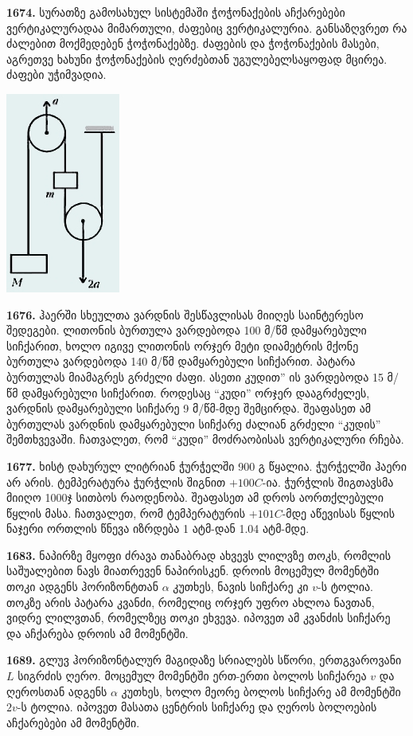 \documentclass[12pt,a4paper,]{report}
\begin{document}
\textbf{1674.} სურათზე გამოსახულ სისტემაში ჭოჭონაქების აჩქარებები ვერტიკალურადაა მიმართული, ძაფებიც ვერტიკალურია. განსაზღვრეთ რა ძალებით მოქმედებენ ჭოჭონაქებზე. ძაფების და ჭოჭონაქების მასები, აგრეთვე ხახუნი ჭოჭონაქების ღერძებთან უგულებელსაყოფად მცირეა. ძაფები უჭიმვადია.
		\begin{center}
			\includegraphics[scale=0.5]{images/F1674}
		\end{center}

\textbf{1676.} ჰაერში სხეულთა ვარდნის შესწავლისას მიიღეს საინტერესო შედეგები. ლითონის ბურთულა ვარდებოდა 100 მ/წმ დამყარებული სიჩქარით, ხოლო იგივე ლითონის  ორჯერ მეტი დიამეტრის მქონე ბურთულა ვარდებოდა 140 მ/წმ დამყარებული სიჩქარით. პატარა ბურთულას მიამაგრეს გრძელი ძაფი. ასეთი კუდით” ის ვარდებოდა 15 მ/წმ დამყარებული სიჩქარით. როდესაც “კუდი” ორჯერ დააგრძელეს, ვარდნის დამყარებული სიჩქარე 9 მ/წმ-მდე შემცირდა.  შეაფასეთ ამ ბურთულას ვარდნის  დამყარებული სიჩქარე ძალიან გრძელი “კუდის” შემთხვევაში. ჩათვალეთ, რომ “კუდი” მოძრაობისას ვერტიკალური რჩება. 

\textbf{1677.} ხისტ დახურულ ლიტრიან ჭურჭელში 900 გ წყალია. ჭურჭელში ჰაერი არ არის. ტემპერატურა ჭურჭლის შიგნით $+100 C$-ია. ჭურჭლის შიგთავსმა მიიღო 1000ჯ სითბოს რაოდენობა. შეაფასეთ ამ დროს აორთქლებული წყლის მასა. ჩათვალეთ, რომ ტემპერატურის $+101 C$-მდე აწევისას წყლის ნაჯერი ორთლის წნევა იზრდება 1 ატმ-დან 1.04 ატმ-მდე.

\textbf{1683.} ნაპირზე მყოფი ძრავა თანაბრად ახვევს ლილვზე თოკს, რომლის საშუალებით ნავს მიათრევენ ნაპირისკენ. დროის მოცემულ მომენტში თოკი ადგენს ჰორიზონტთან $\alpha$ კუთხეს, ნავის სიჩქარე კი $v$-ს ტოლია. თოკზე არის პატარა კვანძი, რომელიც ორჯერ უფრო ახლოა ნავთან, ვიდრე ლილვთან, რომელზეც თოკი ეხვევა. იპოვეთ ამ კვანძის სიჩქარე და აჩქარება დროის ამ მომენტში. 

\textbf{1689.} გლუვ ჰორიზონტალურ მაგიდაზე სრიალებს სწორი, ერთგვაროვანი $L$ სიგრძის ღერო. მოცემულ მომენტში ერთ-ერთი ბოლოს სიჩქარეა $v$ და ღეროსთან ადგენს $\alpha$ კუთხეს, ხოლო მეორე ბოლოს სიჩქარე ამ მომენტში $2v$-ს ტოლია. იპოვეთ მასათა ცენტრის სიჩქარე და ღეროს ბოლოების აჩქარებები ამ მომენტში. 
\end{document}
